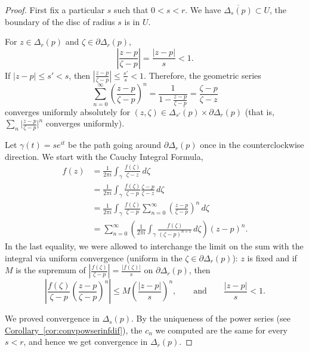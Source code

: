 \documentclass[12pt,openany]{book}
\newcommand{\sabs}[1]{\lvert {#1} \rvert}
\newcommand{\abs}[1]{\left\lvert {#1} \right\rvert}
\theoremstyle{plain}
\theoremstyle{remark}
\theoremstyle{definition}
\theoremstyle{exercise}
\theoremstyle{example}
\newcommand{\corref}[1]{\hyperref[#1]{Corollary~\ref*{#1}}}
\begin{document}
\begin{proof}
First fix a particular $s$ such that $0 < s < r$.
We have $\overline{\Delta_s(p)} \subset U$,
the boundary of the disc of radius $s$ is in $U$.

For $z \in \Delta_r(p)$ and $\zeta \in \partial \Delta_r(p)$, 
\begin{equation*}
\abs{\frac{z-p}{\zeta-p}} =
\frac{\sabs{z-p}}{s} < 1 .
\end{equation*}
If $\sabs{z-p} \leq s' < s$, then
$\abs{\frac{z-p}{\zeta-p}} \leq \frac{s'}{s} < 1$.  Therefore,
the geometric series
\begin{equation*}
\sum_{n=0}^\infty
{\left(\frac{z-p}{\zeta-p}\right)}^n
=
\frac{1}{1-
\frac{z-p}{\zeta-p}}
=
\frac{\zeta-p}{\zeta-z}
\end{equation*}
converges uniformly absolutely for $(z,\zeta) \in \overline{\Delta_{s'}(p)}
\times \partial \Delta_r(p)$ (that is, $\sum_n {\bigl\lvert
\frac{z-p}{\zeta-p} \bigr\rvert}^n$
converges uniformly).

Let $\gamma(t) = s e^{i t}$
be the path going around 
$\partial \Delta_r(p)$ once in the counterclockwise direction.
We start with the Cauchy Integral Formula,
\begin{equation*}
\begin{split}
f(z)
& =
\frac{1}{2\pi i}
\int_{\gamma}
\frac{f(\zeta)}{\zeta-z}
\,
d \zeta 
\\
& =
\frac{1}{2\pi i}
\int_{\gamma}
\frac{f(\zeta)}{\zeta-p}
\frac{\zeta-p}{\zeta-z}
\,
d \zeta 
\\
& =
\frac{1}{2\pi i}
\int_{\gamma}
\frac{f(\zeta)}{\zeta-p}
\sum_{n=0}^\infty
{\left(\frac{z-p}{\zeta-p}\right)}^n
\,
d \zeta 
\\
& =
\sum_{n=0}^\infty
\left(
\frac{1}{2\pi i}
\int_{\gamma}
\frac{f(\zeta)}{{(\zeta-p)}^{n+1}}
\,
d \zeta 
\right)
{(z-p)}^n .
\end{split}
\end{equation*}
In the last equality, we were allowed to 
interchange the limit on the sum with the integral
via uniform convergence (uniform in the $\zeta \in \partial \Delta_r(p)$):
$z$ is fixed and if $M$ is the supremum of $\abs{\frac{f(\zeta)}{\zeta-p}} =
\frac{\sabs{f(\zeta)}}{s}$ on $\partial \Delta_r(p)$,
then
\begin{equation*}
\abs{
\frac{f(\zeta)}{\zeta-p}
{\left(\frac{z-p}{\zeta-p}\right)}^n
}
\leq
M 
{\left(\frac{\abs{z-p}}{s}\right)}^n,
\qquad \text{and} \qquad
\frac{\abs{z-p}}{s} < 1 .
\end{equation*}

We proved convergence in $\Delta_s(p)$.
By the uniqueness of the power series (see \corref{cor:convpowserinfdif}),
the $c_n$ we computed are the same for every $s < r$, and hence
we get convergence in $\Delta_r(p)$.
\end{proof}
\end{document}
